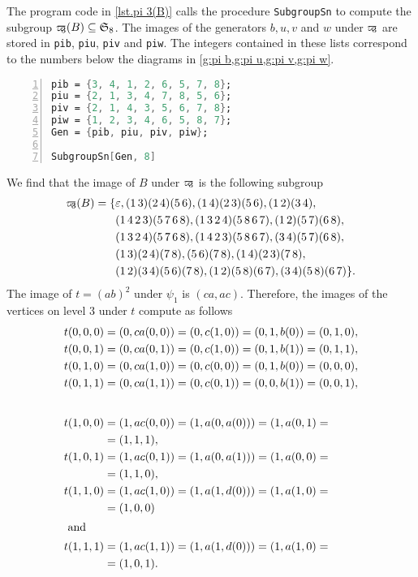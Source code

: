 The program code in \cref{lst.pi 3(B)} calls the procedure \verb+SubgroupSn+ to compute the subgroup $\varpi\hspace{-0.4em}_3(B)\subseteq\mathfrak{S}_8$. The images of the generators $b,u,v$ and $w$ under $\varpi\hspace{-0.4em}_3$ are stored in \verb+pib+, \verb+piu+, \verb+piv+ and \verb+piw+. The integers contained in these lists correspond to the numbers below the diagrams in \cref{g:pi b,g:pi u,g:pi v,g:pi w}.
\begin{lstlisting}[float, caption=Computing $\varpikern_3(B)\subseteq\mathfrak{S}_8$,
                   label=lst.pi 3(B),
                   language=Mathematica, 
                   numbers=left,
                   numberstyle=\tiny,
                   stepnumber=2,
                   numbersep=5pt]
pib = {3, 4, 1, 2, 6, 5, 7, 8};
piu = {2, 1, 3, 4, 7, 8, 5, 6};
piv = {2, 1, 4, 3, 5, 6, 7, 8};
piw = {1, 2, 3, 4, 6, 5, 8, 7};
Gen = {pib, piu, piv, piw};

SubgroupSn[Gen, 8]
\end{lstlisting}
We find that the image of $B$ under $\varpi\hspace{-0.4em}_3$ is the following subgroup
\begin{align*}
\varpi\hspace{-0.4em}_3(B)=\lbrace	&\varepsilon,(1\, 3)(2\, 4)(5\, 6),   (1\, 4)(2\, 3)(5\, 6), (1\, 2)(3\, 4),\\
                    & (1\, 4\, 2\, 3)(5\, 7\, 6\, 8),	(1\, 3\, 2\, 4)(5\, 8\, 6\, 7),   (1\, 2)(5\, 7)(6\, 8),\\
                    & (1\, 3\, 2\, 4)(5\, 7\, 6\, 8),	(1\, 4\, 2\, 3)(5\, 8\, 6\, 7),   (3\, 4)(5\, 7)(6\, 8),\\
                    & (1\, 3)(2\, 4)(7\, 8),   (5\, 6)(7\, 8), 
                    (1\, 4)(2\, 3)(7\, 8),\\
                    & (1\, 2)(3\, 4)(5\, 6)(7\, 8),   (1\, 2)(5\, 8)(6\, 7), (3\, 4)(5\, 8)(6\, 7)\rbrace.
\end{align*}
The image of $t=(ab)^2$ under $\psi_1$ is $(ca,ac)$. Therefore, the images of the vertices on level 3 under $t$ compute as follows
\begin{align*}
t(0,0,0)&=(0,ca(0,0))=(0,c(1,0))=(0,1,b(0))=(0,1,0),\\
t(0,0,1)&=(0,ca(0,1))=(0,c(1,0))=(0,1,b(1))=(0,1,1),\\
t(0,1,0)&=(0,ca(1,0))=(0,c(0,0))=(0,1,b(0))=(0,0,0),\\
t(0,1,1)&=(0,ca(1,1))=(0,c(0,1))=(0,0,b(1))=(0,0,1),\\[2em]
t(1,0,0)&=(1,ac(0,0))=(1,a(0,a(0)))=(1,a(0,1)=\\
        &=(1,1,1),\\
t(1,0,1)&=(1,ac(0,1))=(1,a(0,a(1)))=(1,a(0,0)=\\
        &=(1,1,0),\\
t(1,1,0)&=(1,ac(1,0))=(1,a(1,d(0)))=(1,a(1,0)=\\
        &=(1,0,0)\\
\intertext{ and}
t(1,1,1)&=(1,ac(1,1))=(1,a(1,d(0)))=(1,a(1,0)=\\
        &=(1,0,1).
\end{align*}
